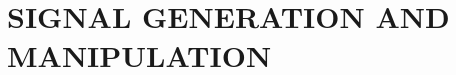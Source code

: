 \documentclass[a4paper,12pt]{report}
\newcommand{\labtopic}{\uppercase{Signal generation and manipulation}}
\begin{document}

\newpage
\section*{\centering \Huge{\labtopic}}
\end{document}
